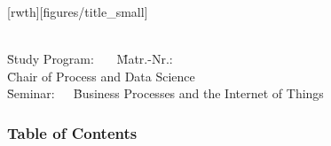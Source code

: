 \documentclass{beamer}
\author[\firstname]{\firstname~\lastname~\email}
\institute[RWTH]{RWTH Aachen University}
\begin{document}
	\beamertemplatenavigationsymbolsempty
[rwth][figures/title_small]{}
\begin{frame}[plain]
	\vspace{1cm}
	\titlepage
	
	\vspace{-6em}
	\parbox{0cm}{
		\begin{tabbing}
			\=\textbf{\firstname~\lastname}\=\\[0.4em]
			\=Study Program: \studyProgram~~~\=Matr.-Nr.:\matrNo\\[0.4em]
			\=Chair of Process and Data Science \=\\%
			\={Seminar:}~~~\=Business Processes and the Internet of Things\\
		\end{tabbing}
	}
\end{frame}
	\begin{frame}
		\frametitle{Table of Contents}
		\tableofcontents
	\end{frame}
\end{document}
